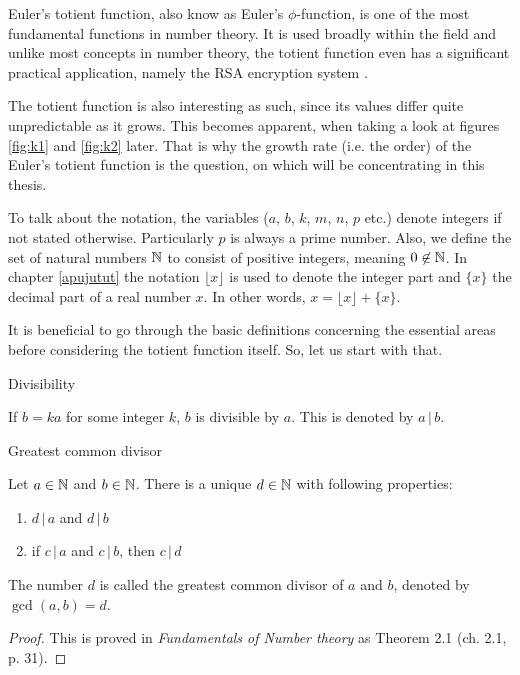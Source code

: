 \documentclass{article}
\begin{document}
Euler's totient function, also know as Euler's $\phi$-function, is one of the most fundamental functions in number theory. It is used broadly within the field and unlike most concepts in number theory, the totient function even has a significant practical application, namely the RSA encryption system \cite{RSA}.

The totient function is also interesting as such, since its values differ quite unpredictable as it grows. This becomes apparent, when taking a look at figures \ref{fig:k1} and \ref{fig:k2} later. That is why the growth rate (i.e. the order) of the Euler's totient function is the question, on which will be concentrating in this thesis.

To talk about the notation, the variables ($a$, $b$, $k$, $m$, $n$, $p$ etc.) denote integers if not stated otherwise. Particularly $p$ is always a prime number. Also, we define the set of natural numbers $\mathbb{N}$ to consist of positive integers, meaning $0 \not\in \mathbb{N}$. In chapter \ref{apujutut} the notation $\lfloor x\rfloor$ is used to denote the integer part and $\{x\}$ the decimal part of a real number $x$. In other words, $x=\lfloor x\rfloor+\{x\}$.

It is beneficial to go through the basic definitions concerning the essential areas before considering the totient function itself. So, let us start with that.

\begin{definition}
Divisibility

If $b=ka$ for some integer $k$, $b$ is divisible by $a$. This is denoted by $a \,\vert\, b$.

\end{definition}

\begin{theorem}
Greatest common divisor

Let $a \in \mathbb{N}$ and $b \in \mathbb{N}$. There is a unique $d \in \mathbb{N}$ with following properties:

\begin{enumerate}
 \item $d \,\vert\, a$ and $d \,\vert\, b$
 \item if $c \,\vert\, a$ and $c \,\vert\, b$, then $c \,\vert\, d$
\end{enumerate}

The number $d$ is called the greatest common divisor of $a$ and $b$, denoted by $\gcd(a,b) = d$.

\begin{proof}
This is proved in \textit{Fundamentals of Number theory} \cite{LeVeque} as Theorem 2.1 (ch. 2.1, p. 31).
\end{proof}
\end{theorem}
\end{document}
